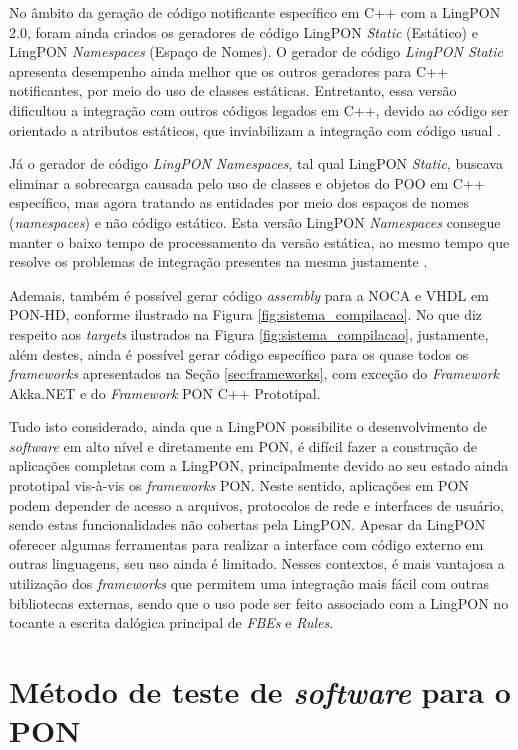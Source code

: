 No âmbito da geração de código notificante específico em C++ com a LingPON 2.0,
foram ainda criados os geradores de código LingPON \textit{Static} (Estático) e
LingPON \textit{Namespaces} (Espaço de Nomes). O gerador de código
\textit{LingPON Static} apresenta desempenho ainda melhor que os outros
geradores para C++ notificantes, por meio do uso de classes estáticas.
Entretanto, essa versão dificultou a integração com outros códigos legados em
C++, devido ao código ser orientado a atributos estáticos, que inviabilizam a
integração com código usual \cite{schutz_2015}.

Já o gerador de código \textit{LingPON Namespaces}, tal qual LingPON
\textit{Static}, buscava eliminar a sobrecarga causada pelo uso de classes e
objetos do POO em C++ específico, mas agora tratando as entidades por meio dos
espaços de nomes (\textit{namespaces}) e não código estático. Esta versão
LingPON \textit{Namespaces} consegue manter o baixo tempo de processamento da versão
estática, ao mesmo tempo que resolve os problemas de integração presentes na
mesma justamente \cite{athayde_2016}.

Ademais, também é possível gerar código \textit{assembly} para a NOCA e VHDL em
PON-HD, conforme ilustrado na Figura \ref{fig:sistema_compilacao}. No que diz
respeito aos \textit{targets} ilustrados na Figura \ref{fig:sistema_compilacao},
justamente, além destes, ainda é possível gerar código específico para os quase todos os
\textit{frameworks} apresentados na Seção \ref{sec:frameworks}, com exceção do
\textit{Framework} Akka.NET e do \textit{Framework} PON C++ Prototipal.

Tudo isto considerado, ainda que a LingPON possibilite o desenvolvimento de
\textit{software} em alto nível e diretamente em PON, é difícil fazer a
construção de aplicações completas com a LingPON, principalmente devido ao seu
estado ainda prototipal vis-à-vis os \textit{frameworks} PON. Neste sentido,
aplicações em PON podem depender de acesso a arquivos, protocolos de rede e
interfaces de usuário, sendo estas funcionalidades não cobertas pela LingPON.
Apesar da LingPON oferecer algumas ferramentas para realizar a interface com
código externo em outras linguagens, seu uso ainda é limitado. Nesses contextos,
é mais vantajosa a utilização dos \textit{frameworks} que permitem uma
integração mais fácil com outras bibliotecas externas, sendo que o uso pode ser
feito associado com a LingPON no tocante a escrita dalógica principal de
\textit{FBEs} e \textit{Rules}.

\section{Método de teste de \textit{software} para o PON}\label{sec:test_pon}

